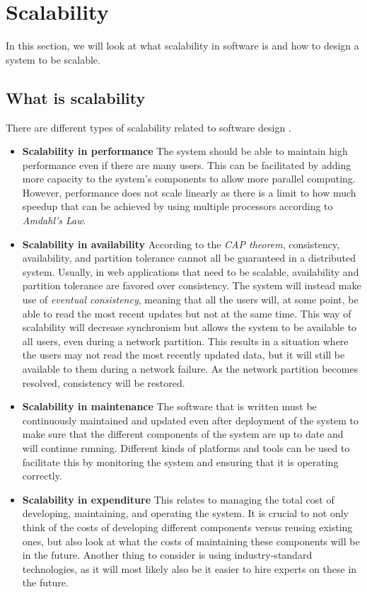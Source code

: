 \section{Scalability}
In this section, we will look at what scalability in software is and how to design a system to be scalable. 

\subsection{What is scalability}
There are different types of scalability related to software design \cite{ScalabilityDesignPrinciples}.
\begin{itemize}
    \item \textbf{Scalability in performance} The system should be able to maintain high performance even if there are many users. This can be facilitated by adding more capacity to the system's components to allow more parallel computing. 
    However, performance does not scale linearly as there is a limit to how much speedup that can be achieved by using multiple processors according to \textit{Amdahl's Law}. 
    \item \textbf{Scalability in availability} According to the \textit{CAP theorem}, consistency, availability, and partition tolerance cannot all be guaranteed in a distributed system. 
    Usually, in web applications that need to be scalable, availability and partition tolerance are favored over consistency. 
    The system will instead make use of \textit{eventual consistency}, meaning that all the users will, at some point, be able to read the most recent updates but not at the same time. 
    This way of scalability will decrease synchronism but allows the system to be available to all users, even during a network partition.
    This results in a situation where the users may not read the most recently updated data, but it will still be available to them during a network failure. As the network partition becomes resolved, consistency will be restored.
    \item \textbf{Scalability in maintenance} The software that is written must be continuously maintained and updated even after deployment of the system to make sure that the different components of the system are up to date and will continue running. 
    Different kinds of platforms and tools can be used to facilitate this by monitoring the system and ensuring that it is operating correctly. 
    \item \textbf{Scalability in expenditure} This relates to managing the total cost of developing, maintaining, and operating the system. 
    It is crucial to not only think of the costs of developing different components versus reusing existing ones, but also look at what the costs of maintaining these components will be in the future. 
    Another thing to consider is using industry-standard technologies, as it will most likely also be it easier to hire experts on these in the future.
\end{itemize}

